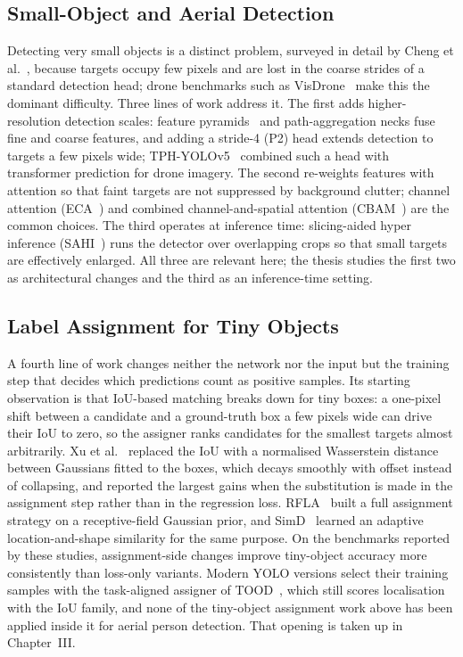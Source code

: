\documentclass[12pt,a4paper,oneside]{report}
\begin{document}
\subsection{Small-Object and Aerial Detection}
Detecting very small objects is a distinct problem, surveyed in detail by Cheng et
al.~\cite{cheng2023smallobject}, because targets occupy few pixels and are lost in
the coarse strides of a standard detection head; drone benchmarks such as
VisDrone~\cite{zhu2021visdrone} make this the dominant difficulty. Three lines of
work address it. The first adds higher-resolution detection scales: feature
pyramids~\cite{lin2017fpn} and path-aggregation necks fuse fine and coarse features,
and adding a stride-4 (P2) head extends detection to targets a few pixels wide;
TPH-YOLOv5~\cite{zhu2021tphyolov5} combined such a head with transformer prediction
for drone imagery. The second re-weights features with attention so that faint
targets are not suppressed by background clutter; channel attention
(ECA~\cite{wang2020eca}) and combined channel-and-spatial attention
(CBAM~\cite{woo2018cbam}) are the common choices. The third operates at inference
time: slicing-aided hyper inference (SAHI~\cite{akyon2022sahi}) runs the detector
over overlapping crops so that small targets are effectively enlarged. All three are
relevant here; the thesis studies the first two as architectural changes and the
third as an inference-time setting.

\subsection{Label Assignment for Tiny Objects}
A fourth line of work changes neither the network nor the input but the
training step that decides which predictions count as positive samples. Its
starting observation is that IoU-based matching breaks down for tiny boxes: a
one-pixel shift between a candidate and a ground-truth box a few pixels wide
can drive their IoU to zero, so the assigner ranks candidates for the smallest
targets almost arbitrarily. Xu et al.~\cite{xu2022nwdrka} replaced the IoU
with a normalised Wasserstein distance between Gaussians fitted to the boxes,
which decays smoothly with offset instead of collapsing, and reported the
largest gains when the substitution is made in the assignment step rather than
in the regression loss. RFLA~\cite{xu2022rfla} built a full assignment strategy
on a receptive-field Gaussian prior, and SimD~\cite{shi2024simd} learned an
adaptive location-and-shape similarity for the same purpose. On the benchmarks
reported by these studies, assignment-side changes improve tiny-object accuracy
more consistently than loss-only variants. Modern YOLO
versions select their training samples with the task-aligned assigner of
TOOD~\cite{feng2021tood}, which still scores localisation with the IoU family,
and none of the tiny-object assignment work above has been applied inside it
for aerial person detection. That opening is taken up in Chapter~III.
\end{document}
